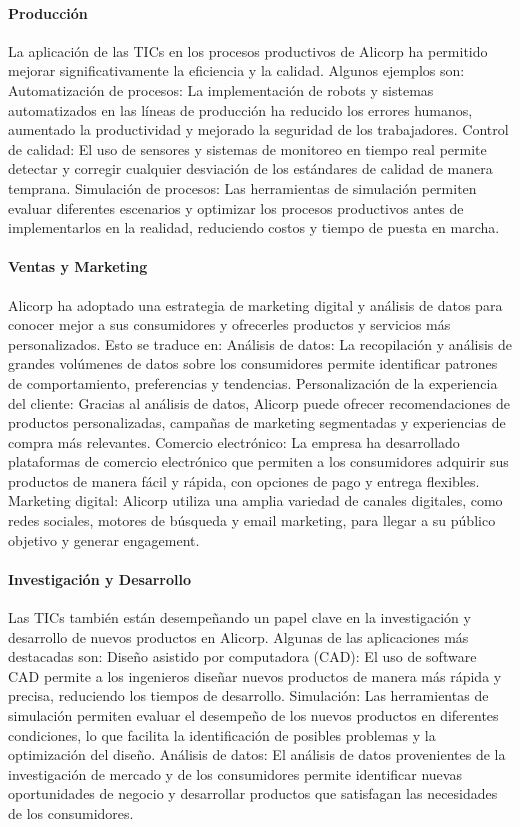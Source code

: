         \paragraph*{Producción}
        La aplicación de las TICs en los procesos productivos de Alicorp ha permitido mejorar significativamente la eficiencia y la calidad. Algunos ejemplos son: 
        Automatización de procesos: La implementación de robots y sistemas automatizados en las líneas de producción ha reducido los errores humanos, aumentado la productividad y mejorado la seguridad de los trabajadores. 
        Control de calidad: El uso de sensores y sistemas de monitoreo en tiempo real permite detectar y corregir cualquier desviación de los estándares de calidad de manera temprana. 
        Simulación de procesos: Las herramientas de simulación permiten evaluar diferentes escenarios y optimizar los procesos productivos antes de implementarlos en la realidad, reduciendo costos y tiempo de puesta en marcha. 
    
        \paragraph*{Ventas y Marketing} 
        Alicorp ha adoptado una estrategia de marketing digital y análisis de datos para conocer mejor a sus consumidores y ofrecerles productos y servicios más personalizados. Esto se traduce en: 
        Análisis de datos: La recopilación y análisis de grandes volúmenes de datos sobre los consumidores permite identificar patrones de comportamiento, preferencias y tendencias. 
        Personalización de la experiencia del cliente: Gracias al análisis de datos, Alicorp puede ofrecer recomendaciones de productos personalizadas, campañas de marketing segmentadas y experiencias de compra más relevantes. 
        Comercio electrónico: La empresa ha desarrollado plataformas de comercio electrónico que permiten a los consumidores adquirir sus productos de manera fácil y rápida, con opciones de pago y entrega flexibles. 
        Marketing digital: Alicorp utiliza una amplia variedad de canales digitales, como redes sociales, motores de búsqueda y email marketing, para llegar a su público objetivo y generar engagement. 
    
        \paragraph*{Investigación y Desarrollo}
        Las TICs también están desempeñando un papel clave en la investigación y desarrollo de nuevos productos en Alicorp. Algunas de las aplicaciones más destacadas son: 
        Diseño asistido por computadora (CAD): El uso de software CAD permite a los ingenieros diseñar nuevos productos de manera más rápida y precisa, reduciendo los tiempos de desarrollo. 
        Simulación: Las herramientas de simulación permiten evaluar el desempeño de los nuevos productos en diferentes condiciones, lo que facilita la identificación de posibles problemas y la optimización del diseño. 
        Análisis de datos: El análisis de datos provenientes de la investigación de mercado y de los consumidores permite identificar nuevas oportunidades de negocio y desarrollar productos que satisfagan las necesidades de los consumidores. 

